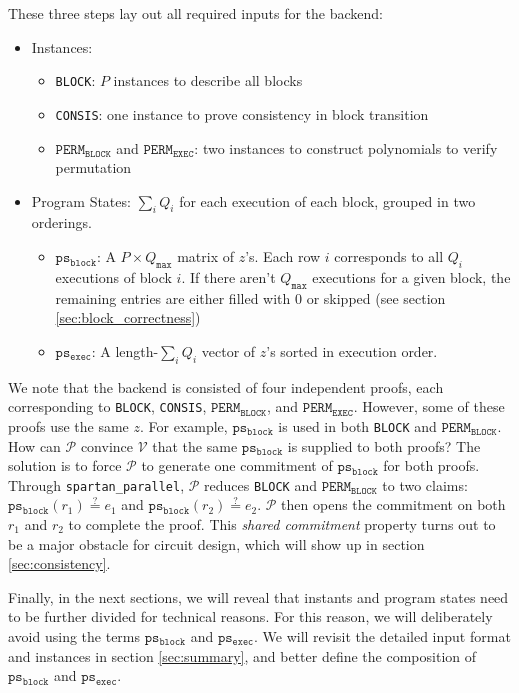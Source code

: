 \documentclass{article}
\newcommand{\code}{\texttt}
\newcommand{\Qmax}{Q_{\mathtt{max}}}
\renewcommand{\P}{\mathcal{P}}
\newcommand{\V}{\mathcal{V}}
\newcommand{\PERMB}{\mathtt{PERM_{BLOCK}}}
\newcommand{\PERME}{\mathtt{PERM_{EXEC}}}
\newcommand{\psb}{\mathtt{ps_{block}}}
\newcommand{\pse}{\mathtt{ps_{exec}}}
\newcommand{\eqq}{\stackrel{?}{=}}
\begin{document}
\noindent These three steps lay out all required inputs for the backend:
\begin{itemize}
    \item Instances:
    \begin{itemize}
        \item \code{BLOCK}: $P$ instances to describe all blocks
        \item \code{CONSIS}: one instance to prove consistency in block transition
        \item $\PERMB$ and $\PERME$: two instances to construct polynomials to verify permutation
    \end{itemize}
    \item Program States: $\sum_i Q_i$ for each execution of each block, grouped in two orderings.
    \begin{itemize}
        \item $\psb$: A $P\times \Qmax$ matrix of $z$'s. Each row $i$ corresponds to all $Q_i$ executions of block $i$. If there aren't $\Qmax$ executions for a given block, the remaining entries are either filled with 0 or skipped (see section \ref{sec:block_correctness})
        \item $\pse$: A length-$\sum_i Q_i$ vector of $z$'s sorted in execution order.
    \end{itemize}
\end{itemize}

We note that the backend is consisted of four independent proofs, each corresponding to \code{BLOCK}, \code{CONSIS}, $\PERMB$, and $\PERME$. However, some of these proofs use the same $z$. For example, $\psb$ is used in both \code{BLOCK} and $\PERMB$. How can $\P$ convince $\V$ that the same $\psb$ is supplied to both proofs? The solution is to force $\P$ to generate one commitment of $\psb$ for both proofs. Through \code{spartan\_parallel}, $\P$ reduces \code{BLOCK} and $\PERMB$ to two claims: $\psb(r_1) \eqq e_1$ and $\psb(r_2) \eqq e_2$. $\P$ then opens the commitment on both $r_1$ and $r_2$ to complete the proof. This \emph{shared commitment} property turns out to be a major obstacle for circuit design, which will show up in section \ref{sec:consistency}.

Finally, in the next sections, we will reveal that instants and program states need to be further divided for technical reasons. For this reason, we will deliberately avoid using the terms $\psb$ and $\pse$. We will revisit the detailed input format and instances in section \ref{sec:summary}, and better define the composition of $\psb$ and $\pse$.
\end{document}
